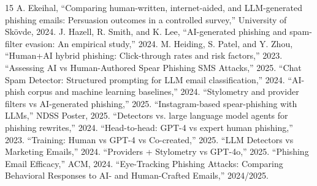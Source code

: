 \documentclass[10pt,twocolumn]{article}
\begin{document}
\begin{thebibliography}{15}
 A. Ekeihal, ``Comparing human-written, internet-aided, and LLM-generated phishing emails: Persuasion outcomes in a controlled survey,'' University of Sk\"ovde, 2024.
 J. Hazell, R. Smith, and K. Lee, ``AI-generated phishing and spam-filter evasion: An empirical study,'' 2024.
 M. Heiding, S. Patel, and Y. Zhou, ``Human+AI hybrid phishing: Click-through rates and risk factors,'' 2023.
 ``Assessing AI vs Human-Authored Spear Phishing SMS Attacks,'' 2025.
 ``Chat Spam Detector: Structured prompting for LLM email classification,'' 2024.
 ``AI-phish corpus and machine learning baselines,'' 2024.
 ``Stylometry and provider filters vs AI-generated phishing,'' 2025.
 ``Instagram-based spear-phishing with LLMs,'' NDSS Poster, 2025.
 ``Detectors vs. large language model agents for phishing rewrites,'' 2024.
 ``Head-to-head: GPT-4 vs expert human phishing,'' 2023.
 ``Training: Human vs GPT-4 vs Co-created,'' 2025.
 ``LLM Detectors vs Marketing Emails,'' 2024.
 ``Providers + Stylometry vs GPT-4o,'' 2025.
 ``Phishing Email Efficacy,'' ACM, 2024.
 ``Eye-Tracking Phishing Attacks: Comparing Behavioral Responses to AI- and Human-Crafted Emails,'' 2024/2025.
\end{thebibliography}
\end{document}
